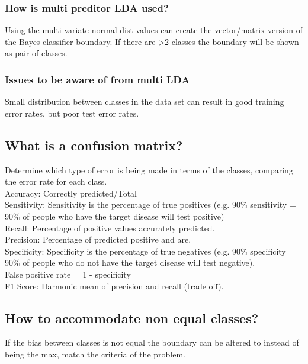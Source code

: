\documentclass[11pt]{scrartcl} %
\begin{document}
\subsubsection{How is multi preditor LDA used?}

Using the multi variate normal dist values can create the vector/matrix version of the Bayes 
classifier boundary. If there are >2 classes the boundary will be shown as pair of classes.

\subsubsection{Issues to be aware of from multi LDA}

Small distribution between classes in the data set can result in good training error rates, but 
poor test error rates.

\subsection{What is a confusion matrix?}

Determine which type of error is being made in terms of the classes, comparing the error rate for
each class.\\

Accuracy: Correctly predicted/Total \\
Sensitivity: Sensitivity is the percentage of true positives (e.g. 90\% sensitivity = 90\% of people who have the target disease will test positive)\\
Recall: Percentage of positive values accurately predicted.\\
Precision: Percentage of predicted positive and are.\\
Specificity: Specificity is the percentage of true negatives (e.g. 90\% specificity = 90\% of people who do not have the target disease will test negative).\\

False positive rate = 1 - specificity\\

F1 Score: Harmonic mean of precision and recall (trade off).
\subsection{How to accommodate non equal classes?}

If the bias between classes is not equal the boundary can be altered to instead of being the max,
match the criteria of the problem.
\end{document}
